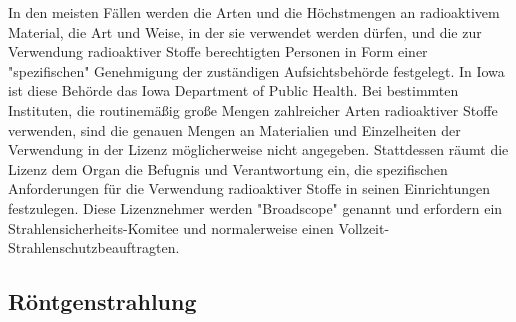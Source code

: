 In den meisten Fällen werden die Arten und die Höchstmengen an radioaktivem Material, die Art und Weise, in der sie verwendet werden dürfen, und die zur Verwendung radioaktiver Stoffe berechtigten Personen in Form einer "spezifischen" Genehmigung der zuständigen Aufsichtsbehörde festgelegt. In Iowa ist diese Behörde das Iowa Department of Public Health. Bei bestimmten Instituten, die routinemäßig große Mengen zahlreicher Arten radioaktiver Stoffe verwenden, sind die genauen Mengen an Materialien und Einzelheiten der Verwendung in der Lizenz möglicherweise nicht angegeben. Stattdessen räumt die Lizenz dem Organ die Befugnis und Verantwortung ein, die spezifischen Anforderungen für die Verwendung radioaktiver Stoffe in seinen Einrichtungen festzulegen. Diese Lizenznehmer werden "Broadscope" genannt und erfordern ein Strahlensicherheits-Komitee und normalerweise einen Vollzeit-Strahlenschutzbeauftragten.

\subsection{Röntgenstrahlung}

